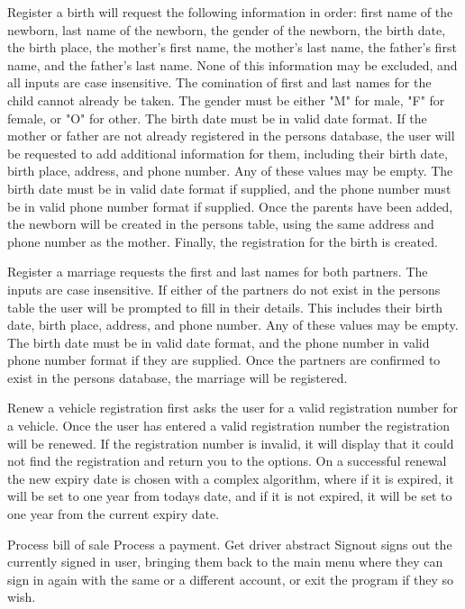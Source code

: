 Register a birth will request the following information in order: first name of
the newborn, last name of the newborn, the gender of the newborn, the birth
date, the birth place, the mother's first name, the mother's last name, the
father's first name, and the father's last name.  None of this information may
be excluded, and all inputs are case insensitive.  The comination of first and
last names for the child cannot already be taken.  The gender must be either
"M" for male, "F" for female, or "O" for other.  The birth date must be in
valid date format.  If the mother or father are not already registered in the
persons database, the user will be requested to add additional information for
them, including their birth date, birth place, address, and phone number.  Any
of these values may be empty.  The birth date must be in valid date format if
supplied, and the phone number must be in valid phone number format if supplied.
Once the parents have been added, the newborn will be created in the persons
table, using the same address and phone number as the mother.  Finally, the
registration for the birth is created.

Register a marriage requests the first and last names for both partners.  The
inputs are case insensitive.  If either of the partners do not exist in the
persons table the user will be prompted to fill in their details.  This includes
their birth date, birth place, address, and phone number.  Any of these values
may be empty.  The birth date must be in valid date format, and the phone number
in valid phone number format if they are supplied.  Once the partners are
confirmed to exist in the persons database, the marriage will be registered.

Renew a vehicle registration first asks the user for a valid registration
number for a vehicle. Once the user has entered a valid registration number the
registration will be renewed. If the registration number is invalid, it will
display that it could not find the registration and return you to the options.
On a successful renewal the new expiry date is chosen with a complex algorithm,
where if it is expired, it will be set to one year from todays date, and if it
is not expired, it will be set to one year from the current expiry date.

Process bill of sale
Process a payment.
Get driver abstract
Signout signs out the currently signed in user, bringing them back to the main
menu where they can sign in again with the same or a different account, or exit
the program if they so wish.


